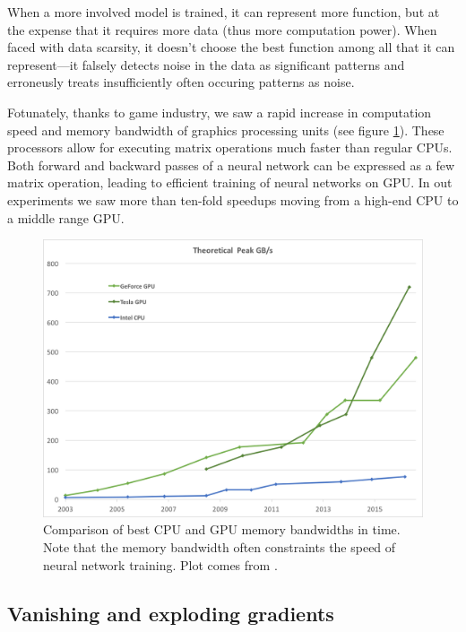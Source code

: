 When a more involved model is trained, it can represent more function, but at the expense that it requires more data (thus more computation power). When faced with data scarsity, it doesn't choose the best function among all that it can represent---it falsely detects noise in the data as significant patterns and erroneusly treats insufficiently often occuring patterns as noise.

Fotunately, thanks to game industry, we saw a rapid increase in computation speed and memory bandwidth of graphics processing units (see figure \ref{nvidia-speed}). These processors allow for executing matrix operations much faster than regular CPUs. Both forward and backward passes of a neural network can be expressed as a few matrix operation, leading to efficient training of neural networks on GPU. In out experiments we saw more than ten-fold speedups moving from a high-end CPU to a middle range GPU.

\begin{figure}[h]
  \includegraphics[width=\linewidth]{images/gpu-bandwidth.png}
  \caption{Comparison of best CPU and GPU memory bandwidths in time. Note that the memory bandwidth often constraints the speed of neural network training. Plot comes from \cite{nvidia-docs}.}\label{nvidia-speed}
\end{figure}

\subsection{Vanishing and exploding gradients}


